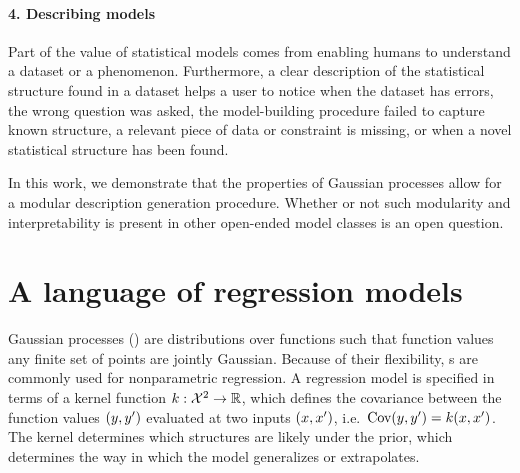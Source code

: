 \documentclass[letterpaper]{article}
\def\ie{i.e.\ }
\begin{document}
\paragraph{4. Describing models}

Part of the value of statistical models comes from enabling humans to understand a dataset or a phenomenon.
Furthermore, a clear description of the statistical structure found in a dataset helps a user to notice when the dataset has errors, the wrong question was asked, the model-building procedure failed to capture known structure, a relevant piece of data or constraint is missing, or when a novel statistical structure has been found.

In this work, we 
demonstrate that the properties of Gaussian processes allow for a modular description generation procedure.
Whether or not such modularity and interpretability is present in other open-ended model classes is an open question.

\fi

\section{A language of regression models}
\label{sec:improvements}




Gaussian processes (\gp{}) \citep{rasmussen38gaussian} are distributions over functions such that function values any finite set of points are jointly Gaussian.
Because of their flexibility, \gp{}s are commonly used for nonparametric regression.
A \gp{} regression model is specified in terms of a kernel function ${k : \mathcal{X}^2 \to \mathbb{R}}$, which defines the covariance between the function values $(y, y')$ evaluated at two inputs $(x,x')$, \ie ${\textrm{Cov}(y, y') = k(x,x')}$.
The kernel determines which structures are likely under the \gp{} prior, which determines the way in which the model generalizes or extrapolates.
\end{document}
